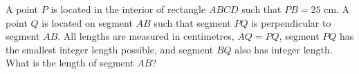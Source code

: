 A point $P$ is located in the interior of rectangle $ABCD$ such that $PB=25$ cm. A point $Q$ is located on segment $AB$ such that segment $PQ$ is perpendicular to segment $AB$. All lengths are measured in centimetres, $AQ=PQ$, segment $PQ$ has the smallest integer length possible, and segment $BQ$ also has integer length. What is the length of segment $AB$?

